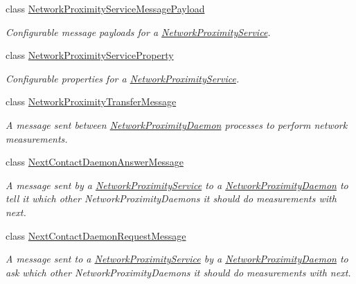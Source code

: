 \begin{DoxyCompactItemize}
class \hyperlink{classwrench_1_1_network_proximity_service_message_payload}{Network\+Proximity\+Service\+Message\+Payload}
\begin{DoxyCompactList}\small\item\em Configurable message payloads for a \hyperlink{classwrench_1_1_network_proximity_service}{Network\+Proximity\+Service}. \end{DoxyCompactList}\item 
class \hyperlink{classwrench_1_1_network_proximity_service_property}{Network\+Proximity\+Service\+Property}
\begin{DoxyCompactList}\small\item\em Configurable properties for a \hyperlink{classwrench_1_1_network_proximity_service}{Network\+Proximity\+Service}. \end{DoxyCompactList}\item 
class \hyperlink{classwrench_1_1_network_proximity_transfer_message}{Network\+Proximity\+Transfer\+Message}
\begin{DoxyCompactList}\small\item\em A message sent between \hyperlink{classwrench_1_1_network_proximity_daemon}{Network\+Proximity\+Daemon} processes to perform network measurements. \end{DoxyCompactList}\item 
class \hyperlink{classwrench_1_1_next_contact_daemon_answer_message}{Next\+Contact\+Daemon\+Answer\+Message}
\begin{DoxyCompactList}\small\item\em A message sent by a \hyperlink{classwrench_1_1_network_proximity_service}{Network\+Proximity\+Service} to a \hyperlink{classwrench_1_1_network_proximity_daemon}{Network\+Proximity\+Daemon} to tell it which other Network\+Proximity\+Daemons it should do measurements with next. \end{DoxyCompactList}\item 
class \hyperlink{classwrench_1_1_next_contact_daemon_request_message}{Next\+Contact\+Daemon\+Request\+Message}
\begin{DoxyCompactList}\small\item\em A message sent to a \hyperlink{classwrench_1_1_network_proximity_service}{Network\+Proximity\+Service} by a \hyperlink{classwrench_1_1_network_proximity_daemon}{Network\+Proximity\+Daemon} to ask which other Network\+Proximity\+Daemons it should do measurements with next. \end{DoxyCompactList}\item 

\end{DoxyCompactItemize}

